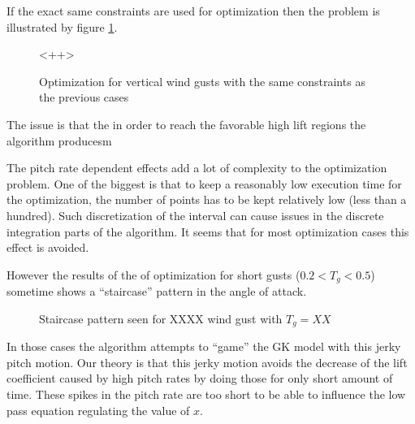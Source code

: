 \par If the exact same constraints are used for optimization then the problem is  illustrated by figure \ref{fig:unlimited_alpha_dot}.	

\begin{figure}[h]
  \begin{center}
  
<++>%
\end{center}
  \caption{Optimization for vertical wind gusts with the same constraints as the previous cases}
  \label{fig:unlimited_alpha_dot}
\end{figure}

The issue is that the in order to reach the favorable high lift regions the algorithm producesm

The pitch rate dependent effects add a lot of complexity to the optimization problem.
One of the biggest is that to keep a reasonably low execution time for the optimization, the number of points has to be kept relatively low (less than a hundred).
Such discretization of the interval can cause issues in the discrete integration parts of the algorithm.
It seems that for most optimization cases this effect is avoided.

\par However the results of the of optimization for short gusts ($0.2<T_g<0.5$) sometime shows a ``staircase'' pattern in the angle of attack.

\begin{figure}[h]
  \centering
  \caption{Staircase pattern seen for XXXX wind gust with $T_g=XX$}
  \label{fig:staircase_case}
\end{figure}

\par In those cases the algorithm attempts to ``game'' the GK model with this jerky pitch motion.
Our theory is that this jerky motion avoids the decrease of the lift coefficient caused by high pitch rates by doing those for only short amount of time.
These spikes in the pitch rate are too short to be able to influence the low pass equation regulating the value of $x$.


